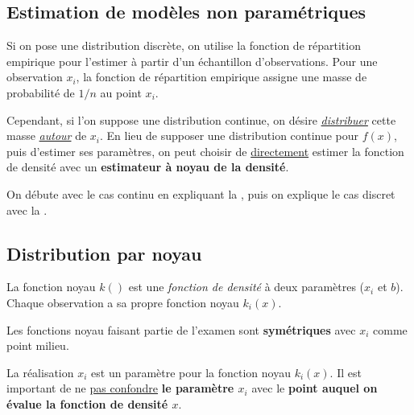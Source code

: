 \documentclass[french]{article}
\begin{document}
\begin{multicols*}{2}
\pagebreak
\section{Estimation de modèles non paramétriques}
\begin{rappel_enhanced}[Contexte]
Si on pose une distribution discrète, on utilise la fonction de répartition empirique pour l'estimer à partir d'un échantillon d'observations. Pour une observation $x_{i}$, la fonction de répartition empirique assigne une masse de probabilité de $1/n$ au point $x_{i}$. 

\bigskip

Cependant, si l'on suppose une distribution continue, on désire \underline{\textit{distribuer}} cette masse \textit{\underline{autour}} de $x_{i}$. En lieu de supposer une distribution continue pour $f(x)$, puis d'estimer ses paramètres, on peut choisir de \underline{directement} estimer la fonction de densité avec un \textbf{estimateur à noyau de la densité}.
\end{rappel_enhanced}


On débute avec le cas continu en expliquant la \underline{\textit{}}, puis on explique le cas discret avec la \underline{\textit{}}.


\columnbreak
\subsection{Distribution par noyau}\label{subsec:kernelDistr}
\begin{definitionNOHFILL}
La fonction noyau $k()$ est une \textit{fonction de densité} à deux paramètres ($x_{i}$ et $b$).	Chaque observation a sa propre fonction noyau $k_{i}(x)$.

\bigskip

\begin{rappel_enhanced}[Contexte]
Les fonctions noyau faisant partie de l'examen sont \textbf{symétriques} avec $x_{i}$ comme point milieu. 
\end{rappel_enhanced}
\end{definitionNOHFILL}

\begin{definitionNOHFILLsub}
La réalisation $x_{i}$ est un paramètre pour la fonction noyau $k_{i}(x)$. Il est important de ne \underline{pas confondre} \textbf{le paramètre $x_{i}$} avec le \textbf{point auquel on évalue la fonction de densité $x$}.


\end{definitionNOHFILLsub}
\end{multicols*}
\end{document}
